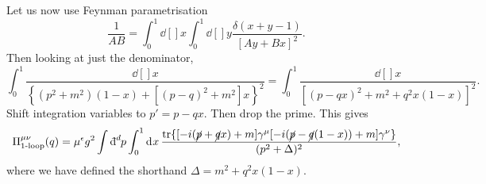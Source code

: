 Let us now use Feynman parametrisation
\begin{equation}
  \frac{1}{AB} = \int_0^1 \dd[]{x} \int_0^1 \dd[]{y} \frac{\delta(x + y - 1)}{[Ay + B x]^2}.
\end{equation}
Then looking at just the denominator,
\begin{equation}
  \int_0^1 \frac{\dd[]{x}}{\left\{ (p^2 + m^2)(1 - x) + [(p - q)^2 + m^2]x \right\}^2} = \int_0^1 \frac{\dd[]{x}}{[(p - qx)^2 + m^2 + q^2 x(1 - x)]^2}.
\end{equation}
Shift integration variables to $p' = p - q x$. Then drop the prime.
This gives
\begin{equation}
  \Pi_{\text{1-loop}}^{\mu\nu}(q) = \mu^{\epsilon} g^2 \int \bdd[d]{p} \int_0^1	\dd[]{x} \frac{\tr{[-i (\cancel{p} + \cancel{q} x) + m] \gamma^{\mu} [-i (\cancel{p} - \cancel{q}(1 - x)) + m] \gamma^{\nu}}}{(p^2 + \Delta)^2},
\end{equation}
where we have defined the shorthand $\Delta = m^2 + q^2 x(1 - x)$.
